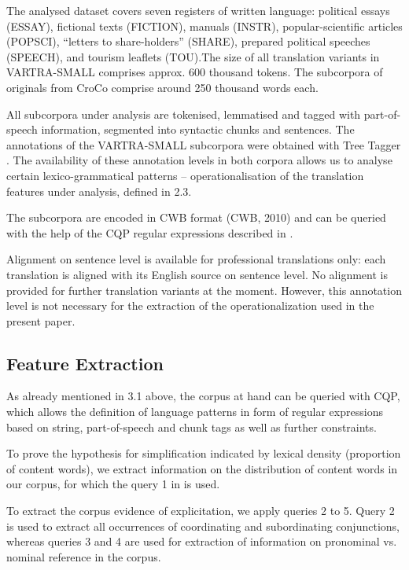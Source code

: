 \documentclass[output=paper]{LSP/langsci}
\begin{document}
The analysed dataset covers seven registers of written language: political essays (ESSAY), fictional texts (FICTION), manuals (INSTR), popular-scientific articles (POPSCI), “letters to share-holders” (SHARE), prepared political speeches (SPEECH), and tourism leaflets (TOU).The size of all translation variants in VARTRA-SMALL comprises approx. 600 thousand tokens.  The subcorpora of originals from CroCo comprise around 250 thousand words each.

All subcorpora under analysis are tokenised, lemmatised and tagged with part-of-speech information, segmented into syntactic chunks and sentences.  The annotations of the VARTRA-SMALL subcorpora were obtained with Tree Tagger \citep{Schmid1994}. The availability of these annotation levels in both corpora allows us to analyse certain lexico-grammatical patterns – operationalisation of the translation features under analysis, defined in 2.3.

The subcorpora are encoded in CWB format (CWB, 2010) and can be queried with the help of the CQP regular expressions described in \citep{Evert2005}.

Alignment on sentence level is available for professional translations only: each translation is aligned with its English source on sentence level.  No alignment is provided for further translation variants at the moment. However, this annotation level is not necessary for the extraction of the operationalization used in the present paper.

\subsection{Feature Extraction}
As already mentioned in 3.1 above, the corpus at hand can be queried with CQP, which allows the definition of language patterns in form of regular expressions based on string, part-of-speech and chunk tags as well as further constraints.

To prove the hypothesis for simplification indicated by lexical density (proportion of content words), we extract information on the distribution of content words in our corpus, for which the query 1 in  is used.

To extract the corpus evidence of explicitation, we apply queries 2 to 5. Query 2 is used to extract all occurrences of coordinating and subordinating conjunctions, whereas queries 3 and 4 are used for extraction of information on pronominal vs. nominal reference in the corpus. 
\end{document}
